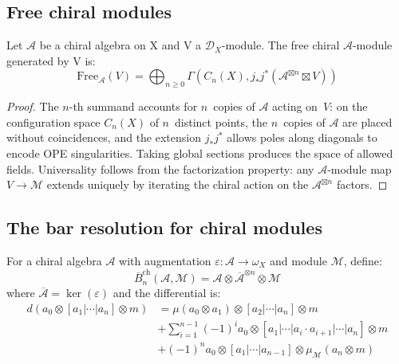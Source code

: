 \subsection{Free chiral modules}

\begin{lemma}\label{lem:free-chiral-module-structure}
Let $\mathcal{A}$ be a chiral algebra on X and V a $\mathcal{D}_X$-module. The free chiral $\mathcal{A}$-module generated by V is:
\[
\text{Free}_{\mathcal{A}}(V) = \bigoplus_{n \geq 0} \Gamma(C_n(X), j_*j^*(\mathcal{A}^{\boxtimes n} \boxtimes V))
\]
\end{lemma}

\begin{proof}
The $n$-th summand accounts for $n$~copies of $\mathcal{A}$ acting
on~$V$: on the configuration space $C_n(X)$ of $n$~distinct points,
the $n$~copies of $\mathcal{A}$ are placed without coincidences, and
the extension $j_*j^*$ allows poles along diagonals to encode OPE
singularities. Taking global sections produces the space of allowed
fields. Universality follows from the factorization property: any
$\mathcal{A}$-module map $V \to \mathcal{M}$ extends uniquely by
iterating the chiral action on the $\mathcal{A}^{\boxtimes n}$
factors.
\end{proof}

\subsection{The bar resolution for chiral modules}

\begin{definition}
\label{def:bar-complex-modules}
For a chiral algebra $\mathcal{A}$ with augmentation $\varepsilon: \mathcal{A} \to \omega_X$ and module $\mathcal{M}$, define:
\[
\overline{B}_n^{\text{ch}}(\mathcal{A}, \mathcal{M}) = \mathcal{A} \otimes \overline{\mathcal{A}}^{\otimes n} \otimes \mathcal{M}
\]
where $\overline{\mathcal{A}} = \ker(\varepsilon)$ and the differential is:
\begin{align}
d(a_0 \otimes [a_1|\cdots|a_n] \otimes m) &= \mu(a_0 \otimes a_1) \otimes [a_2|\cdots|a_n] \otimes m \\
&+ \sum_{i=1}^{n-1} (-1)^i a_0 \otimes [a_1|\cdots|a_i \cdot a_{i+1}|\cdots|a_n] \otimes m \\
&+ (-1)^n a_0 \otimes [a_1|\cdots|a_{n-1}] \otimes \mu_{\mathcal{M}}(a_n \otimes m)
\end{align}
\end{definition}

